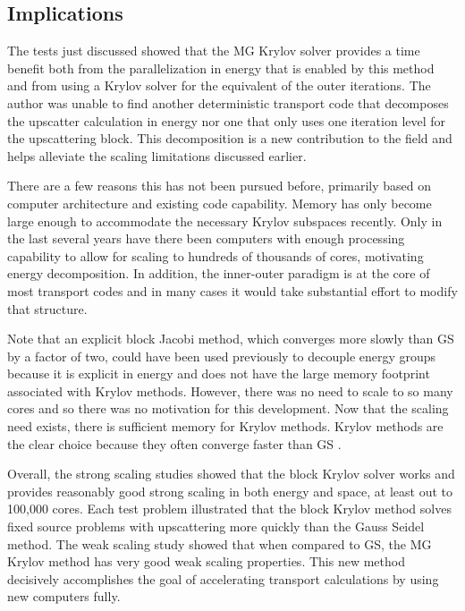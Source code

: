 \subsection{Implications}
The tests just discussed showed that the MG Krylov solver provides a time benefit both from the parallelization in energy that is enabled by this method and from using a Krylov solver for the equivalent of the outer iterations. The author was unable to find another deterministic transport code that decomposes the upscatter calculation in energy nor one that only uses one iteration level for the upscattering block. This decomposition is a new contribution to the field and helps alleviate the scaling limitations discussed earlier.   

There are a few reasons this has not been pursued before, primarily based on computer architecture and existing code capability. Memory has only become large enough to accommodate the necessary Krylov subspaces recently. Only in the last several years have there been computers with enough processing capability to allow for scaling to hundreds of thousands of cores, motivating energy decomposition. In addition, the inner-outer paradigm is at the core of most transport codes and in many cases it would take substantial effort to modify that structure. 

Note that an explicit block Jacobi method, which converges more slowly than GS by a factor of two, could have been used previously to decouple energy groups because it is explicit in energy and does not have the large memory footprint associated with Krylov methods. However, there was no need to scale to so many cores and so there was no motivation for this development. Now that the scaling need exists, there is sufficient memory for Krylov methods. Krylov methods are the clear choice because they often converge faster than GS \cite{LeVeque2007}. 

Overall, the strong scaling studies showed that the block Krylov solver works and provides reasonably good strong scaling in both energy and space, at least out to 100,000 cores. Each test problem illustrated that the block Krylov method solves fixed source problems with upscattering more quickly than the Gauss Seidel method. The weak scaling study showed that when compared to GS, the MG Krylov method has very good weak scaling properties. This new method decisively accomplishes the goal of accelerating transport calculations by using new computers fully.

